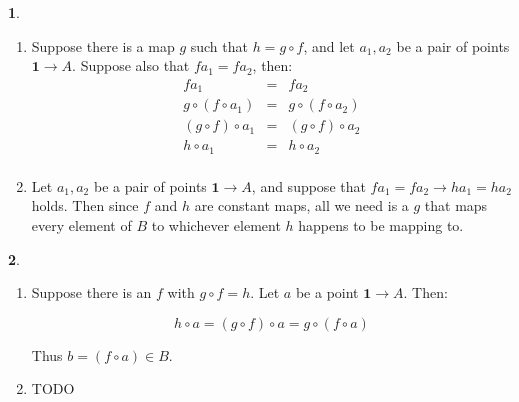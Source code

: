 \documentclass{article}
\theoremstyle{definition}
\theoremstyle{definition}
\theoremstyle{definition}
\newtheorem{solution-internal}{}[subsection]
\newenvironment{solution}{
  \begin{solution-internal}
}{
  \end{solution-internal}
}
\begin{document}
\begin{solution}
  $ $
  \begin{enumerate}[label=\alph*.]
    \item Suppose there is a map $g$ such that $h = g \circ f$, and let $a_1, a_2$ be a pair
  of points $\mathbf{1} \to A$. Suppose also that $f a_1 = f a_2$, then:
  \[
  \begin{array}{rcl}
    f a_1 &=& f a_2\\
    g \circ (f \circ a_1) &=& g \circ (f \circ a_2)\\
    (g \circ f) \circ a_1 &=& (g \circ f) \circ a_2\\
    h \circ a_1 &=& h \circ a_2\\
  \end{array}
  \]
\item Let $a_1, a_2$ be a pair of points $\mathbf{1} \to A$, and suppose that $f
  a_1 = f a_2 \rightarrow h a_1 = h a_2$ holds. Then since $f$ and $h$ are
  constant maps, all we need is a $g$ that maps every element of $B$ to
  whichever element $h$ happens to be mapping to.
\begin{center}
\end{center}
\end{enumerate}
\end{solution}

\begin{solution}
  $ $ 
  \begin{enumerate}[label=\alph*.]
    \item Suppose there is an $f$ with $g \circ f = h$. Let $a$ be a point $\mathbf{1}
  \to A$. Then:

  \begin{minipage}{.5\textwidth}
  \[ h \circ a = (g \circ f) \circ a = g \circ (f \circ a) \]
  \end{minipage}%
  \begin{minipage}{.5\textwidth}
  \end{minipage}

Thus $b = (f \circ a) \in B$.
\item TODO
\end{enumerate}
\end{solution}
\end{document}
